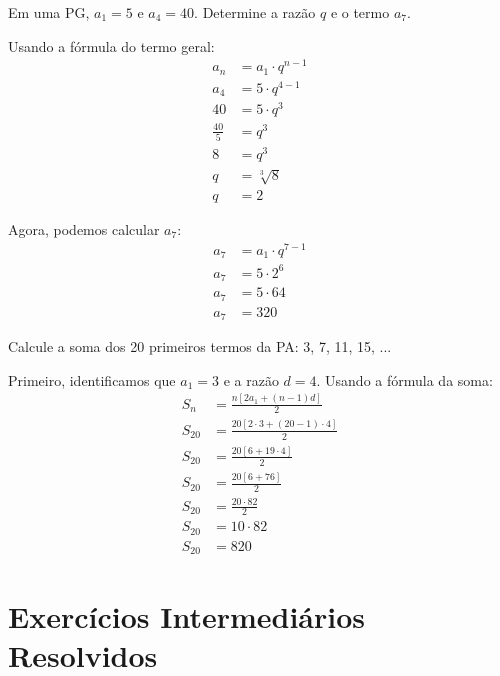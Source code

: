 \documentclass[12pt,a4paper]{article}
\begin{document}
\begin{tcolorbox}[colback=blue!5!white,colframe=blue!75!black,title=Exercício B4]
Em uma PG, $a_1 = 5$ e $a_4 = 40$. Determine a razão $q$ e o termo $a_7$.
\end{tcolorbox}

\begin{tcolorbox}[colback=green!5!white,colframe=green!75!black,title=Resolução]
Usando a fórmula do termo geral:
\begin{align}
a_n &= a_1 \cdot q^{n-1}\\
a_4 &= 5 \cdot q^{4-1}\\
40 &= 5 \cdot q^3\\
\frac{40}{5} &= q^3\\
8 &= q^3\\
q &= \sqrt[3]{8}\\
q &= 2
\end{align}

Agora, podemos calcular $a_7$:
\begin{align}
a_7 &= a_1 \cdot q^{7-1}\\
a_7 &= 5 \cdot 2^6\\
a_7 &= 5 \cdot 64\\
a_7 &= 320
\end{align}
\end{tcolorbox}

\begin{tcolorbox}[colback=blue!5!white,colframe=blue!75!black,title=Exercício B5]
Calcule a soma dos 20 primeiros termos da PA: 3, 7, 11, 15, ...
\end{tcolorbox}

\begin{tcolorbox}[colback=green!5!white,colframe=green!75!black,title=Resolução]
Primeiro, identificamos que $a_1 = 3$ e a razão $d = 4$. Usando a fórmula da soma:
\begin{align}
S_n &= \frac{n[2a_1 + (n-1)d]}{2}\\
S_{20} &= \frac{20[2 \cdot 3 + (20-1) \cdot 4]}{2}\\
S_{20} &= \frac{20[6 + 19 \cdot 4]}{2}\\
S_{20} &= \frac{20[6 + 76]}{2}\\
S_{20} &= \frac{20 \cdot 82}{2}\\
S_{20} &= 10 \cdot 82\\
S_{20} &= 820
\end{align}
\end{tcolorbox}

\section{Exercícios Intermediários Resolvidos}
\end{document}
